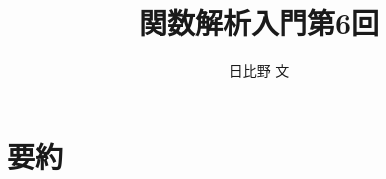 \documentclass[12pt,a4paper]{ltjsarticle}
\begin{document}
\title{関数解析入門第6回}
\author{日比野 文}
\maketitle

\section{要約}
\end{document}
